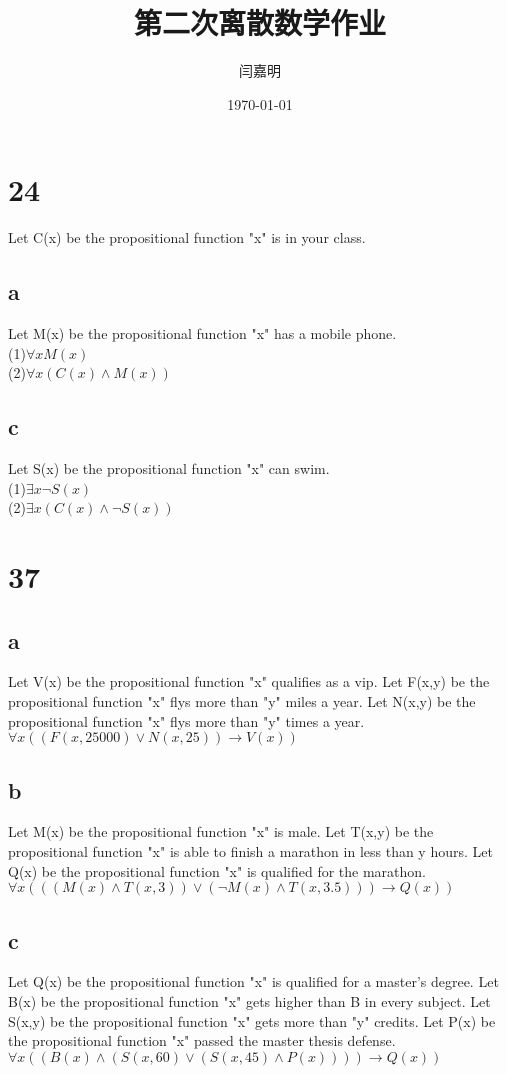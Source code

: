\documentclass[UTF8]{ctexart}
\title{\heiti 第二次离散数学作业}
\author{\kaishu 闫嘉明}
\date{\today}
\begin{document}
    \maketitle
    \section{24}
    Let C(x) be the propositional function "x" is in your class.
    \subsection{a}
    Let M(x) be the propositional function "x" has a mobile phone.\\
    (1)$\forall x M(x)$\\
    (2)$\forall x (C(x) \wedge M(x))$
    \subsection{c}
    Let S(x) be the propositional function "x" can swim.\\
    (1)$\exists x \neg S(x)$\\
    (2)$\exists x (C(x) \wedge \neg S(x))$
    \section{37}
    \subsection{a}
    Let V(x) be the propositional function "x" qualifies as a vip.
    Let F(x,y) be the propositional function "x" flys more than "y" miles a year.
    Let N(x,y) be the propositional function "x" flys more than "y" times a year.\\
    $\forall x((F(x,25000) \vee N(x,25))\rightarrow V(x))$
    \subsection{b}
    Let M(x) be the propositional function "x" is male.
    Let T(x,y) be the propositional function "x" is able to finish a marathon in less than y hours.
    Let Q(x) be the propositional function "x" is qualified for the marathon.\\
    $\forall x (((M(x) \wedge T(x,3)) \vee (\neg M(x) \wedge T(x,3.5)))\rightarrow Q(x))$
    \subsection{c}
    Let Q(x) be the propositional function "x" is qualified for a master's degree.
    Let B(x) be the propositional function "x" gets higher than B in every subject.
    Let S(x,y) be the propositional function "x" gets more than "y" credits.
    Let P(x) be the propositional function "x" passed the master thesis defense.\\
    $\forall x ((B(x) \wedge (S(x,60) \vee (S(x,45) \wedge P(x))))\rightarrow Q(x))$
\end{document}
